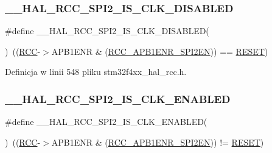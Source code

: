 \subsubsection{\texorpdfstring{\+\_\+\+\_\+\+H\+A\+L\+\_\+\+R\+C\+C\+\_\+\+S\+P\+I2\+\_\+\+I\+S\+\_\+\+C\+L\+K\+\_\+\+D\+I\+S\+A\+B\+L\+ED}{\_\_HAL\_RCC\_SPI2\_IS\_CLK\_DISABLED}}
{\footnotesize\ttfamily \#define \+\_\+\+\_\+\+H\+A\+L\+\_\+\+R\+C\+C\+\_\+\+S\+P\+I2\+\_\+\+I\+S\+\_\+\+C\+L\+K\+\_\+\+D\+I\+S\+A\+B\+L\+ED(\begin{DoxyParamCaption}{ }\end{DoxyParamCaption})~((\hyperlink{group___peripheral__declaration_ga74944438a086975793d26ae48d5882d4}{R\+CC}-\/$>$A\+P\+B1\+E\+NR \& (\hyperlink{group___peripheral___registers___bits___definition_gafdce64692c44bf95efbf2fed054e59be}{R\+C\+C\+\_\+\+A\+P\+B1\+E\+N\+R\+\_\+\+S\+P\+I2\+EN})) == \hyperlink{group___exported__types_gga89136caac2e14c55151f527ac02daaffa589b7d94a3d91d145720e2fed0eb3a05}{R\+E\+S\+ET})}



Definicja w linii 548 pliku stm32f4xx\+\_\+hal\+\_\+rcc.\+h.

\mbox{\label{group___r_c_c___a_p_b1___peripheral___clock___enable___disable___status_ga282522dda9557cf715be3ee13c031a5b}} 
\subsubsection{\texorpdfstring{\+\_\+\+\_\+\+H\+A\+L\+\_\+\+R\+C\+C\+\_\+\+S\+P\+I2\+\_\+\+I\+S\+\_\+\+C\+L\+K\+\_\+\+E\+N\+A\+B\+L\+ED}{\_\_HAL\_RCC\_SPI2\_IS\_CLK\_ENABLED}}
{\footnotesize\ttfamily \#define \+\_\+\+\_\+\+H\+A\+L\+\_\+\+R\+C\+C\+\_\+\+S\+P\+I2\+\_\+\+I\+S\+\_\+\+C\+L\+K\+\_\+\+E\+N\+A\+B\+L\+ED(\begin{DoxyParamCaption}{ }\end{DoxyParamCaption})~((\hyperlink{group___peripheral__declaration_ga74944438a086975793d26ae48d5882d4}{R\+CC}-\/$>$A\+P\+B1\+E\+NR \& (\hyperlink{group___peripheral___registers___bits___definition_gafdce64692c44bf95efbf2fed054e59be}{R\+C\+C\+\_\+\+A\+P\+B1\+E\+N\+R\+\_\+\+S\+P\+I2\+EN})) != \hyperlink{group___exported__types_gga89136caac2e14c55151f527ac02daaffa589b7d94a3d91d145720e2fed0eb3a05}{R\+E\+S\+ET})}



